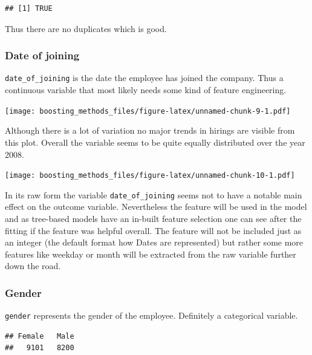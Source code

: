 \documentclass[
]{book}
\newenvironment{Shaded}{\begin{snugshade}}{\end{snugshade}}
\newcommand{\CommentTok}[1]{\textcolor[rgb]{0.56,0.35,0.01}{\textit{#1}}}
\newcommand{\FunctionTok}[1]{\textcolor[rgb]{0.00,0.00,0.00}{#1}}
\newcommand{\NormalTok}[1]{#1}
\newcommand{\SpecialCharTok}[1]{\textcolor[rgb]{0.00,0.00,0.00}{#1}}
\begin{document}
\begin{verbatim}
## [1] TRUE
\end{verbatim}

Thus there are no duplicates which is good.

\hypertarget{date-of-joining}{%
\subsubsection{Date of joining}\label{date-of-joining}}

\texttt{date\_of\_joining} is the date the employee has joined the company. Thus a continuous variable that most likely needs some kind of feature engineering.

\texttt{[image: boosting\_methods\_files/figure-latex/unnamed-chunk-9-1.pdf]}

Although there is a lot of variation no major trends in hirings are visible from this plot. Overall the variable seems to be quite equally distributed over the year 2008.

\texttt{[image: boosting\_methods\_files/figure-latex/unnamed-chunk-10-1.pdf]}

In its raw form the variable \texttt{date\_of\_joining} seems not to have a notable main effect on the outcome variable. Nevertheless the feature will be used in the model and as tree-based models have an in-built feature selection one can see after the fitting if the feature was helpful overall. The feature will not be included just as an integer (the default format how Dates are represented) but rather some more features like weekday or month will be extracted from the raw variable further down the road.

\hypertarget{gender}{%
\subsubsection{Gender}\label{gender}}

\texttt{gender} represents the gender of the employee. Definitely a categorical variable.

\begin{Shaded}
\end{Shaded}

\begin{verbatim}
## Female   Male 
##   9101   8200
\end{verbatim}
\end{document}

